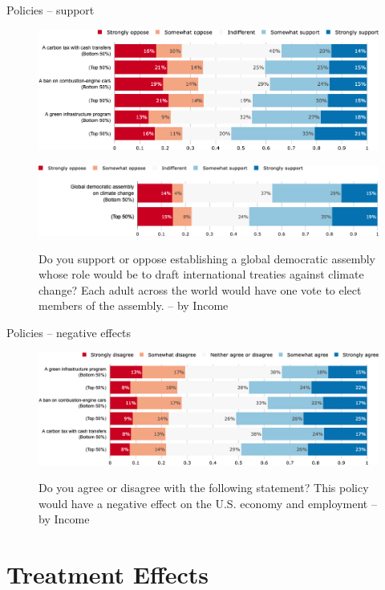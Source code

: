\documentclass[aspectratio=169,9pt,dvipsnames]{beamer}
\begin{document}
\begin{frame}{Policies – support}%
\vspace{-.5cm}
\begin{figure}[h!]
\caption{Do you support or oppose the following policy? -- by Income}
\includegraphics[width=.6\textwidth]{../figures/US/policies_support_US_inc.png} \\
\vspace{.5cm}
\caption{Do you support or oppose establishing a global democratic assembly whose role would be to draft international treaties against climate change? Each adult across the world would have one vote to elect members of the assembly. -- by Income}
\includegraphics[width=.6\textwidth]{../figures/US/global_assembly_support_US_inc.png} \\
\end{figure}
\end{frame}

\begin{frame}{Policies – negative effects}%
\vspace{-.5cm}
\begin{figure}[h!]
\caption{Do you agree or disagree with the following statement? This policy would have a negative effect on the U.S. economy and employment -- by Income}
\includegraphics[width=.8\textwidth]{../figures/US/policies_negative_effect_US_inc.png} \\
\end{figure}
\end{frame}

\section{Treatment Effects}
\end{document}
